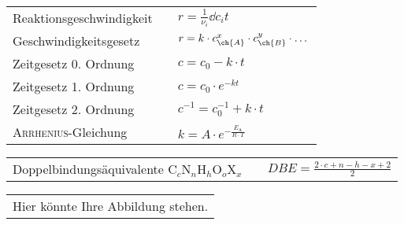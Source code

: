 \documentclass[./main.tex]{subfiles}
\begin{document}
\begin{formulabox}[Kinetik]
  \begin{center}
  \renewcommand{\arraystretch}{1.4}
    \begin{tabular}{>{\raggedleft\arraybackslash}p{} p{}p{}}
        Reaktionsgeschwindigkeit & & $\displaystyle r=\frac{1}{\nu_i}\dd{c_i}{t}$ \\
        Geschwindigkeitsgesetz & & $r=k\cdot c_{\ch{A}}^x\cdot c_{\ch{B}}^y \cdot \dots$ \\
        Zeitgesetz 0. Ordnung & & $c=c_0-k\cdot t$ \\
        Zeitgesetz 1. Ordnung & & $c=c_0\cdot e^{-kt}$ \\
        Zeitgesetz 2. Ordnung & & $c^{-1}=c_0^{-1}+k\cdot t$ \\
        \textsc{Arrhenius}-Gleichung & & $\displaystyle k=A\cdot e^{-\frac{E_{\mathrm{A}}}{R\cdot T}}$ \\
    \end{tabular}
  \end{center}
\end{formulabox}

\begin{formulabox}
  \begin{center}
  \renewcommand{\arraystretch}{1.4}
    \begin{tabular}{>{\raggedleft\arraybackslash}p{} p{}p{}}
        Doppelbindungs\"aquivalente C$_c$N$_n$H$_h$O$_o$X$_x$ & & \multirow{2}{*}{$\displaystyle DBE=\frac{2\cdot c+n-h-x+2}{2}$}\\
    \end{tabular}
  \end{center}
\end{formulabox}

\begin{formulabox}
  \begin{center}
  \renewcommand{\arraystretch}{1.4}
    \begin{tabular}{c}
        Hier k\"onnte Ihre Abbildung stehen.
    \end{tabular}
  \end{center}
\end{formulabox}
\end{document}
